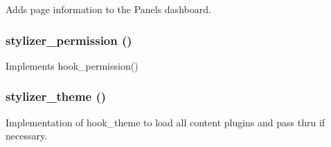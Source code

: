 Adds page information to the Panels dashboard. \hypertarget{stylizer_8module_a9d624ecb21d6a13f01a4bb9caa98fe18}{
\subsubsection[{stylizer\_\-permission}]{\setlength{\rightskip}{0pt plus 5cm}stylizer\_\-permission ()}}
\label{stylizer_8module_a9d624ecb21d6a13f01a4bb9caa98fe18}
Implements hook\_\-permission() \hypertarget{stylizer_8module_a5226a61bbe6d9de962a2f842db402993}{
\subsubsection[{stylizer\_\-theme}]{\setlength{\rightskip}{0pt plus 5cm}stylizer\_\-theme ()}}
\label{stylizer_8module_a5226a61bbe6d9de962a2f842db402993}
Implementation of hook\_\-theme to load all content plugins and pass thru if necessary. 